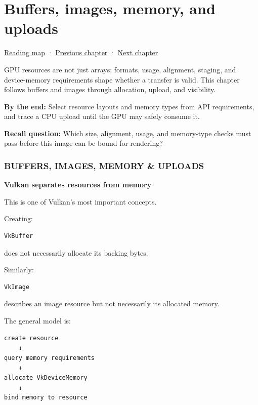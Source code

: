 \chapter{Buffers, images, memory, and uploads}\label{05-engine-i-ch021-buffers-images-memory-and-uploads}\hypertarget{05-engine-i-ch021}{}\label{stagechapter:05-engine-i-ch021}

\hyperref[volume-reading-map]{Reading map} · \hyperref[05-engine-i-ch020-gpu-performance-models-and-principled-redesign]{Previous chapter} · \hyperref[05-engine-i-ch022-vulkan-synchronization-and-multi-frame-lifetimes]{Next chapter}

GPU resources are not just arrays; formats, usage, alignment, staging, and device-memory requirements shape whether a transfer is valid. This chapter follows buffers and images through allocation, upload, and visibility.

\textbf{By the end:} Select resource layouts and memory types from API requirements, and trace a CPU upload until the GPU may safely consume it.

\textbf{Recall question:} Which size, alignment, usage, and memory-type checks must pass before this image can be bound for rendering?

\subsection{BUFFERS, IMAGES, MEMORY \& UPLOADS}\label{05-engine-i-ch021-buffers-images-memory-uploads}

\textbf{Vulkan separates resources from memory}

This is one of Vulkan's most important concepts.

Creating:

\begin{verbatim}
VkBuffer
\end{verbatim}

does not necessarily allocate its backing bytes.

Similarly:

\begin{verbatim}
VkImage
\end{verbatim}

describes an image resource but not necessarily its allocated memory.

The general model is:

\begin{verbatim}
create resource
    ↓
query memory requirements
    ↓
allocate VkDeviceMemory
    ↓
bind memory to resource
\end{verbatim}

